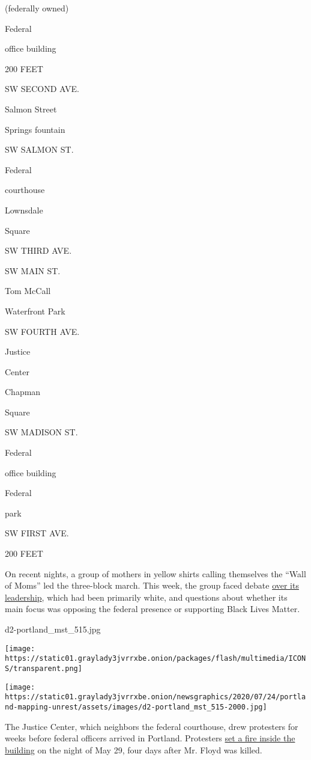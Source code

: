 (federally owned)

Federal

office building

200 FEET

SW SECOND AVE.

Salmon Street

Springs fountain

SW SALMON ST.

Federal

courthouse

Lownsdale

Square

SW THIRD AVE.

SW MAIN ST.

Tom McCall

Waterfront Park

SW FOURTH AVE.

Justice

Center

Chapman

Square

SW MADISON ST.

Federal

office building

Federal

park

SW FIRST AVE.

200 FEET

On recent nights, a group of mothers in yellow shirts calling themselves
the ``Wall of Moms'' led the three-block march. This week, the group
faced debate
\href{https://www.oregonlive.com/news/2020/07/portlands-wall-of-moms-crumbles-amid-online-allegations-by-former-partner-dont-shoot-pdx.html}{over
its leadership}, which had been primarily white, and questions about
whether its main focus was opposing the federal presence or supporting
Black Lives Matter.

d2-portland\_mst\_515.jpg

\texttt{[image: https://static01.graylady3jvrrxbe.onion/packages/flash/multimedia/ICONS/transparent.png]}

\texttt{[image: https://static01.graylady3jvrrxbe.onion/newsgraphics/2020/07/24/portland-mapping-unrest/assets/images/d2-portland\_mst\_515-2000.jpg]}

The Justice Center, which neighbors the federal courthouse, drew
protesters for weeks before federal officers arrived in Portland.
Protesters
\href{https://www.oregonlive.com/crime/2020/07/32-year-old-man-faces-federal-arson-charge-stemming-from-fire-inside-justice-center.html}{set
a fire inside the building} on the night of May 29, four days after Mr.
Floyd was killed.

